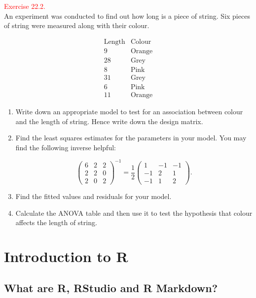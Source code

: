 \documentclass[
]{book}
\providecommand{\tightlist}{%
  \setlength{\itemsep}{0pt}\setlength{\parskip}{0pt}}
\begin{document}
\hfill\break

\hypertarget{exer22.2}{}
\textcolor{red}{Exercise 22.2.}\\
An experiment was conducted to find out how long is a piece of string. Six pieces of string were measured along with their colour.

\[\begin{array}{c|l}
\mbox{Length} & \mbox{Colour} \\ \hline
9 & \mbox{Orange} \\
28 & \mbox{Grey} \\
8 & \mbox{Pink} \\
31 & \mbox{Grey} \\
6 & \mbox{Pink} \\
11 & \mbox{Orange}
\end{array} \]

\begin{enumerate}
\def\labelenumi{\alph{enumi}.}
\tightlist
\item
  Write down an appropriate model to test for an association between colour and the length of string. Hence write down the design matrix.\\
\item
  Find the least squares estimates for the parameters in your model. You may find the following inverse helpful:

  \[\begin{pmatrix} 6 & 2 & 2 \\ 2 & 2 & 0 \\ 2 & 0 & 2 \end{pmatrix}^{-1} = \frac{1}{2} \begin{pmatrix} 1 & -1 & -1 \\ -1 & 2 & 1 \\ -1 & 1 & 2 \end{pmatrix}.\]
\item
  Find the fitted values and residuals for your model.\\
\item
  Calculate the ANOVA table and then use it to test the hypothesis that colour affects the length of string.\\
\end{enumerate}

\hypertarget{introR}{%
\chapter{Introduction to R}\label{introR}}

\hypertarget{introR_what}{%
\section{What are R, RStudio and R Markdown?}\label{introR_what}}
\end{document}
